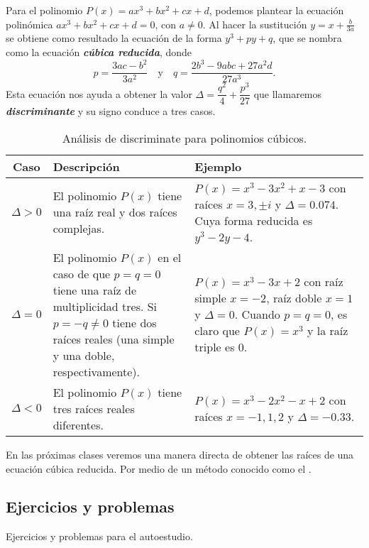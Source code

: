 Para el polinomio $P(x) = ax^3 + bx^2 + cx + d$, podemos plantear la ecuación polinómica $ax^3 + bx^2 + cx + d = 0$, con $a \neq 0$.
Al hacer la sustitución $y = x + \frac{b}{3a}$ se obtiene como resultado la ecuación de la forma $y^3 + py + q$, que se nombra como la ecuación \textbf{\emph{cúbica reducida}}, donde
\[
    p = \frac{3ac - b^2}{3a^2}\quad\text{y}\quad q = \frac{2b^3 - 9abc + 27a^2 d}{27a^3}.
\]
Esta ecuación nos ayuda a obtener la valor $\Delta = \dfrac{q^2}{4} + \dfrac{p^3}{27}$ que llamaremos \textbf{\emph{discriminante}} y su signo conduce a tres casos.
\begin{table}[H]
    \centering
    \begin{tabular}{| c | p{6.5cm} | p{6.5cm} |}
        \hline
        Caso & Descripción & Ejemplo \\ \hline
        $\Delta > 0$ & El polinomio $P(x)$ tiene una raíz real y dos raíces complejas.&
            $P(x) = x^3 - 3x^2 + x - 3$ con raíces $x = 3, \pm i$ y $\Delta = 0.074$.
            Cuya forma reducida es $y^3 - 2y - 4$. \\\hline
        $\Delta = 0$ & El polinomio $P(x)$ en el caso de que $p = q = 0$ tiene una raíz de multiplicidad tres.
        Si $p = -q \neq 0$ tiene dos raíces reales (una simple y una doble, respectivamente).&
            $P(x) = x^3 - 3x + 2$ con raíz simple $x = -2$, raíz doble $x = 1$ y $\Delta = 0$.
            Cuando $p = q = 0$, es claro que $P(x) = x^3$ y la raíz triple es 0.\\\hline
        $\Delta < 0$ & El polinomio $P(x)$ tiene tres raíces reales diferentes.&
            $P(x) = x^3 - 2x^2 - x + 2$ con raíces $x = -1, 1, 2$ y $\Delta = -0.33$. \\\hline
    \end{tabular}
    \caption{Análisis de discriminate para polinomios cúbicos.}
\end{table}

En las próximas clases veremos una manera directa de obtener las raíces de una ecuación cúbica reducida.
Por medio de un método conocido como el .



\subsection{Ejercicios y problemas}

Ejercicios y problemas para el autoestudio.

\showLine

